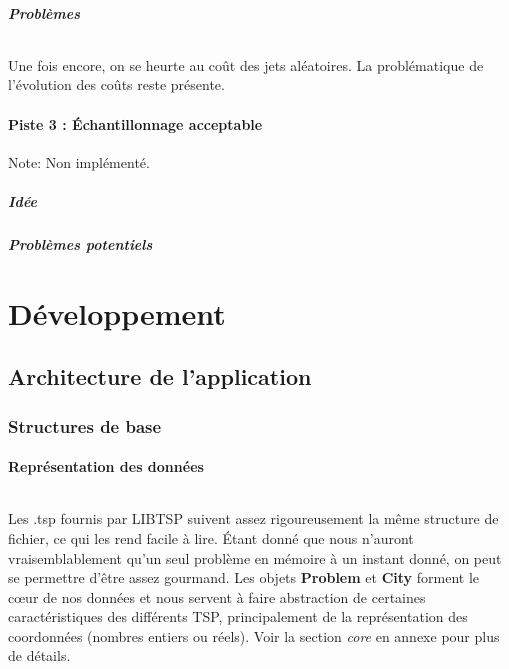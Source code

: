 \documentclass[a4paper,10pt]{report}
\begin{document}

\subsubsection{Problèmes}

\paragraph{}
  Une fois encore, on se heurte au coût des jets aléatoires. La problématique
de l'évolution des coûts reste présente.


\pagebreak
\subsection{Piste 3 : Échantillonnage acceptable}
Note: Non implémenté.
\subsubsection{Idée}

\subsubsection{Problèmes potentiels}


\part{Développement}
\chapter{Architecture de l'application}
\section{Structures de base}
\subsection{Représentation des données}
\paragraph{}
  Les .tsp fournis par LIBTSP suivent assez rigoureusement la même structure de
fichier, ce qui les rend facile à lire. Étant donné que nous n'auront
vraisemblablement qu'un seul problème en mémoire à un instant donné, on peut se
permettre d'être assez gourmand. Les objets \textbf{Problem} et \textbf{City}
forment le cœur de nos données et nous servent à faire abstraction de certaines
caractéristiques des différents TSP, principalement de la représentation des
coordonnées (nombres entiers ou réels). Voir la section \textit{core} en annexe
pour plus de détails.
\end{document}
